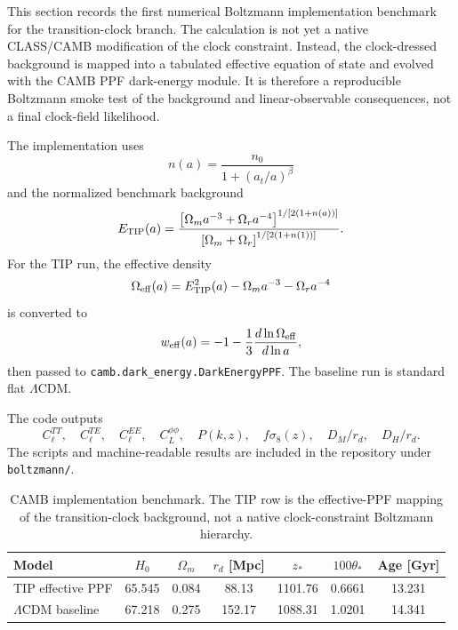 \documentclass[aps,prd,reprint,nofootinbib,superscriptaddress,longbibliography]{revtex4-2}
\begin{document}
This section records the first numerical Boltzmann implementation benchmark for the transition-clock branch. The calculation is not yet a native CLASS/CAMB modification of the clock constraint. Instead, the clock-dressed background is mapped into a tabulated effective equation of state and evolved with the CAMB PPF dark-energy module. It is therefore a reproducible Boltzmann smoke test of the background and linear-observable consequences, not a final clock-field likelihood.

The implementation uses
\begin{equation}
 n(a)=\frac{n_0}{1+(a_t/a)^\beta}
\end{equation}
and the normalized benchmark background
\begin{equation}
 E_{\rm TIP}(a)=
 \frac{\left[\Omega_m a^{-3}+\Omega_r a^{-4}\right]^{1/[2(1+n(a))]}}
 {\left[\Omega_m+\Omega_r\right]^{1/[2(1+n(1))]}} .
\end{equation}
For the TIP run, the effective density
\begin{equation}
 \Omega_{\rm eff}(a)=E_{\rm TIP}^2(a)-\Omega_m a^{-3}-\Omega_r a^{-4}
\end{equation}
is converted to
\begin{equation}
 w_{\rm eff}(a)=-1-\frac{1}{3}\frac{d\ln\Omega_{\rm eff}}{d\ln a},
\end{equation}
then passed to \texttt{camb.dark\_energy.DarkEnergyPPF}. The baseline run is standard flat $\Lambda$CDM.

The code outputs
\begin{equation}
 C_\ell^{TT},\quad C_\ell^{TE},\quad C_\ell^{EE},\quad C_L^{\phi\phi},\quad
 P(k,z),\quad f\sigma_8(z),\quad D_M/r_d,\quad D_H/r_d .
\end{equation}
The scripts and machine-readable results are included in the repository under \texttt{boltzmann/}.

\begin{table}[t]
\caption{CAMB implementation benchmark. The TIP row is the effective-PPF mapping of the transition-clock background, not a native clock-constraint Boltzmann hierarchy.}
\label{tab:camb-implementation-benchmark}
\begin{ruledtabular}
\begin{tabular}{lcccccc}
Model & $H_0$ & $\Omega_m$ & $r_d$ [Mpc] & $z_\ast$ & $100\theta_\ast$ & Age [Gyr]\\
\hline
TIP effective PPF & 65.545 & 0.084 & 88.13 & 1101.76 & 0.6661 & 13.231\\
$\Lambda$CDM baseline & 67.218 & 0.275 & 152.17 & 1088.31 & 1.0201 & 14.341
\end{tabular}
\end{ruledtabular}
\end{table}
\end{document}
